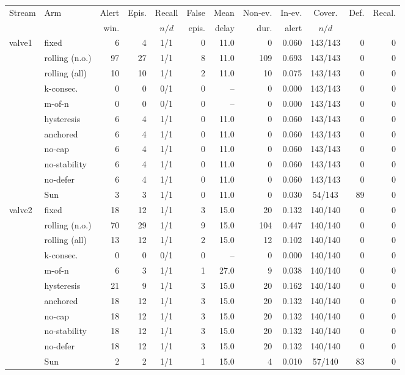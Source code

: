 \begin{tabular}{llrrcrrrrcrr}
\toprule
Stream & Arm & Alert & Epis. & Recall & False & Mean & Non-ev. & In-ev. & Cover. & Def. & Recal. \\
& & win. & & $n/d$ & epis. & delay & dur. & alert & $n/d$ & & \\
\midrule
valve1 & fixed & 6 & 4 & 1/1 & 0 & 11.0 & 0 & 0.060 & 143/143 & 0 & 0 \\
 & rolling (n.o.) & 97 & 27 & 1/1 & 8 & 11.0 & 109 & 0.693 & 143/143 & 0 & 0 \\
 & rolling (all) & 10 & 10 & 1/1 & 2 & 11.0 & 10 & 0.075 & 143/143 & 0 & 0 \\
 & k-consec. & 0 & 0 & 0/1 & 0 & -- & 0 & 0.000 & 143/143 & 0 & 0 \\
 & m-of-n & 0 & 0 & 0/1 & 0 & -- & 0 & 0.000 & 143/143 & 0 & 0 \\
 & hysteresis & 6 & 4 & 1/1 & 0 & 11.0 & 0 & 0.060 & 143/143 & 0 & 0 \\
 & anchored & 6 & 4 & 1/1 & 0 & 11.0 & 0 & 0.060 & 143/143 & 0 & 0 \\
 & no-cap & 6 & 4 & 1/1 & 0 & 11.0 & 0 & 0.060 & 143/143 & 0 & 0 \\
 & no-stability & 6 & 4 & 1/1 & 0 & 11.0 & 0 & 0.060 & 143/143 & 0 & 0 \\
 & no-defer & 6 & 4 & 1/1 & 0 & 11.0 & 0 & 0.060 & 143/143 & 0 & 0 \\
 & Sun & 3 & 3 & 1/1 & 0 & 11.0 & 0 & 0.030 & 54/143 & 89 & 0 \\
\midrule
valve2 & fixed & 18 & 12 & 1/1 & 3 & 15.0 & 20 & 0.132 & 140/140 & 0 & 0 \\
 & rolling (n.o.) & 70 & 29 & 1/1 & 9 & 15.0 & 104 & 0.447 & 140/140 & 0 & 0 \\
 & rolling (all) & 13 & 12 & 1/1 & 2 & 15.0 & 12 & 0.102 & 140/140 & 0 & 0 \\
 & k-consec. & 0 & 0 & 0/1 & 0 & -- & 0 & 0.000 & 140/140 & 0 & 0 \\
 & m-of-n & 6 & 3 & 1/1 & 1 & 27.0 & 9 & 0.038 & 140/140 & 0 & 0 \\
 & hysteresis & 21 & 9 & 1/1 & 3 & 15.0 & 20 & 0.162 & 140/140 & 0 & 0 \\
 & anchored & 18 & 12 & 1/1 & 3 & 15.0 & 20 & 0.132 & 140/140 & 0 & 0 \\
 & no-cap & 18 & 12 & 1/1 & 3 & 15.0 & 20 & 0.132 & 140/140 & 0 & 0 \\
 & no-stability & 18 & 12 & 1/1 & 3 & 15.0 & 20 & 0.132 & 140/140 & 0 & 0 \\
 & no-defer & 18 & 12 & 1/1 & 3 & 15.0 & 20 & 0.132 & 140/140 & 0 & 0 \\
 & Sun & 2 & 2 & 1/1 & 1 & 15.0 & 4 & 0.010 & 57/140 & 83 & 0 \\
\bottomrule
\end{tabular}%
